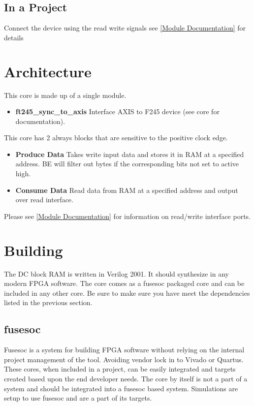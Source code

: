 

\subsection{In a Project}
\par
Connect the device using the read write signals see \ref{Module Documentation} for details

\section{Architecture}
\par
This core is made up of a single module.
\begin{itemize}
  \item \textbf{ft245\_sync\_to\_axis} Interface AXIS to F245 device (see core for documentation).
\end{itemize}

\par
This core has 2 always blocks that are sensitive to the positive clock edge.

\begin{itemize}
\item \textbf{Produce Data} Takes write input data and stores it in RAM at a specified address. BE will filter out bytes if the corresponding bits not set to active high.
\item \textbf{Consume Data} Read data from RAM at a specified address and output over read interface.
\end{itemize}

Please see \ref{Module Documentation} for information on read/write interface ports.

\section{Building}

\par
The DC block RAM is written in Verilog 2001. It should synthesize in any modern FPGA software. The core comes as a fusesoc packaged core and can be
included in any other core. Be sure to make sure you have meet the dependencies listed in the previous section.

\subsection{fusesoc}
\par
Fusesoc is a system for building FPGA software without relying on the internal project management of the tool. Avoiding vendor lock in to Vivado or Quartus.
These cores, when included in a project, can be easily integrated and targets created based upon the end developer needs. The core by itself is not a part of
a system and should be integrated into a fusesoc based system. Simulations are setup to use fusesoc and are a part of its targets.

